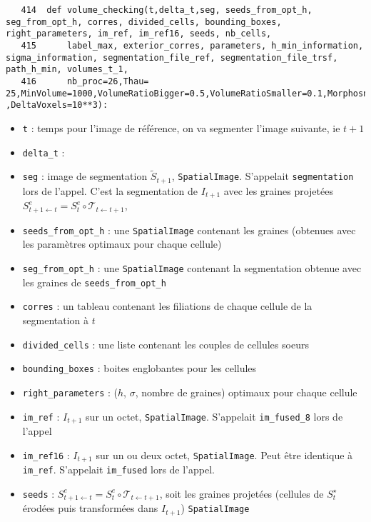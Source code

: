 \documentclass{article}
\def \mycolor {red}
\begin{document}
\begin{verbatim}
   414	def volume_checking(t,delta_t,seg, seeds_from_opt_h, seg_from_opt_h, corres, divided_cells, bounding_boxes, right_parameters, im_ref, im_ref16, seeds, nb_cells, 
   415	    label_max, exterior_corres, parameters, h_min_information, sigma_information, segmentation_file_ref, segmentation_file_trsf, path_h_min, volumes_t_1, 
   416	    nb_proc=26,Thau= 25,MinVolume=1000,VolumeRatioBigger=0.5,VolumeRatioSmaller=0.1,MorphosnakeIterations=10,NIterations=200 ,DeltaVoxels=10**3):
\end{verbatim} 
\color{\mycolor}
\begin{itemize}
\itemsep -1ex
\item \verb|t| : temps pour l'image de r\'ef\'erence, on va segmenter l'image suivante, ie $t+1$
\item \verb|delta_t| : 
\item \verb|seg| : image de segmentation $\tilde{S}_{t+1}$, \texttt{SpatialImage}. S'appelait \verb|segmentation| lors de l'appel. C'est la segmentation de $I_{t+1}$ avec les graines projet\'ees $S^e_{t+1 \leftarrow t} = S^e_t \circ \mathcal{T}_{t \leftarrow t+1}$,
\item \verb|seeds_from_opt_h| : une \texttt{SpatialImage} contenant les graines (obtenues avec les param\`etres optimaux pour chaque cellule)
\item \verb|seg_from_opt_h| : une \texttt{SpatialImage} contenant la segmentation obtenue avec les graines de \verb|seeds_from_opt_h| 
\item \verb|corres| : un tableau contenant les filiations de chaque cellule de la segmentation \`a $t$
\item \verb|divided_cells| : une liste contenant les couples de cellules soeurs
\item \verb|bounding_boxes| : boites englobantes pour les cellules
\item \verb|right_parameters| : ($h$, $\sigma$, nombre de graines) optimaux pour chaque cellule
\item \verb|im_ref| : $I_{t+1}$ sur un octet, \texttt{SpatialImage}. S'appelait \verb|im_fused_8| lors de l'appel
\item \verb|im_ref16| : $I_{t+1}$ sur un ou deux octet, \texttt{SpatialImage}. Peut \^etre identique \`a \verb|im_ref|. S'appelait \verb|im_fused| lors de l'appel.
\item \verb|seeds| : $S^e_{t+1 \leftarrow t} = S^e_t \circ \mathcal{T}_{t \leftarrow t+1}$, soit les graines projet\'ees (cellules de $S^{\star}_t$ \'erod\'ees puis transform\'ees dans $I_{t+1}$) \texttt{SpatialImage}

\end{itemize}
\end{document}
